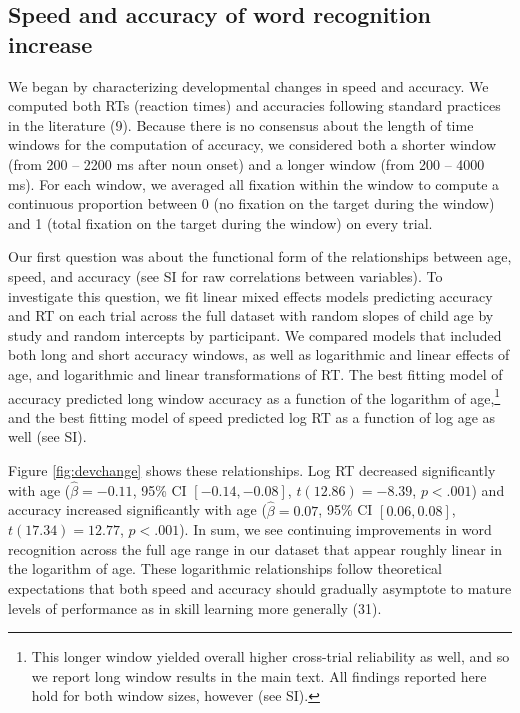 \documentclass[9pt,twocolumn,twoside,]{pnas-new}
\begin{document}
\subsection*{Speed and accuracy of word recognition
increase}\label{speed-and-accuracy-of-word-recognition-increase}

We began by characterizing developmental changes in speed and accuracy.
We computed both RTs (reaction times) and accuracies following standard
practices in the literature (9). Because there is no consensus about the
length of time windows for the computation of accuracy, we considered
both a shorter window (from 200 -- 2200 ms after noun onset) and a
longer window (from 200 -- 4000 ms). For each window, we averaged all
fixation within the window to compute a continuous proportion between 0
(no fixation on the target during the window) and 1 (total fixation on
the target during the window) on every trial.

Our first question was about the functional form of the relationships
between age, speed, and accuracy (see SI for raw correlations between
variables). To investigate this question, we fit linear mixed effects
models predicting accuracy and RT on each trial across the full dataset
with random slopes of child age by study and random intercepts by
participant. We compared models that included both long and short
accuracy windows, as well as logarithmic and linear effects of age, and
logarithmic and linear transformations of RT. The best fitting model of
accuracy predicted long window accuracy as a function of the logarithm
of age,\footnote{This longer window yielded overall higher cross-trial
  reliability as well, and so we report long window results in the main
  text. All findings reported here hold for both window sizes, however
  (see SI).} and the best fitting model of speed predicted log RT as a
function of log age as well (see SI).

Figure \ref{fig:devchange} shows these relationships. Log RT decreased
significantly with age (\(\hat{\beta} = -0.11\), 95\% CI
\([-0.14, -0.08]\), \(t(12.86) = -8.39\), \(p < .001\)) and accuracy
increased significantly with age (\(\hat{\beta} = 0.07\), 95\% CI
\([0.06, 0.08]\), \(t(17.34) = 12.77\), \(p < .001\)). In sum, we see
continuing improvements in word recognition across the full age range in
our dataset that appear roughly linear in the logarithm of age. These
logarithmic relationships follow theoretical expectations that both
speed and accuracy should gradually asymptote to mature levels of
performance as in skill learning more generally (31).
\end{document}
